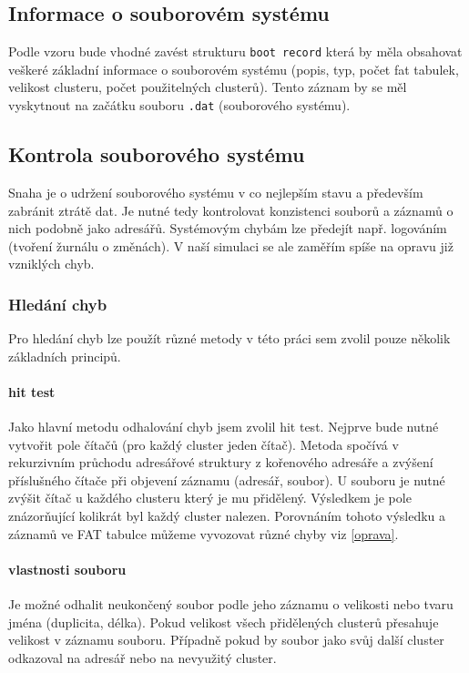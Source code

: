 \documentclass[12pt]{article}
\begin{document}
\subsection{Informace o souborovém systému}
Podle vzoru bude vhodné zavést strukturu \texttt{boot record} která by měla obsahovat veškeré základní informace o souborovém systému (popis, typ, počet fat tabulek, velikost clusteru, počet použitelných clusterů). Tento záznam by se měl vyskytnout na začátku souboru \texttt{.dat} (souborového systému).

\subsection{Kontrola souborového systému}
Snaha je o udržení souborového systému v co nejlepším stavu a především zabránit ztrátě dat. Je nutné tedy kontrolovat konzistenci souborů a záznamů o nich podobně jako adresářů. Systémovým chybám lze předejít např. logováním (tvoření žurnálu o změnách). V naší simulaci se ale zaměřím spíše na opravu již vzniklých chyb.

\subsubsection{Hledání chyb}
Pro hledání chyb lze použít různé metody v této práci sem zvolil pouze několik základních principů.

\paragraph{hit test}
Jako hlavní metodu odhalování chyb jsem zvolil hit test. Nejprve bude nutné vytvořit pole čítačů (pro každý cluster jeden čítač). Metoda spočívá v rekurzivním průchodu adresářové struktury z kořenového adresáře a zvýšení příslušného čítače při objevení záznamu (adresář, soubor). U souboru je nutné zvýšit čítač u každého clusteru který je mu přidělený. Výsledkem je pole znázorňující kolikrát byl každý cluster nalezen. Porovnáním tohoto výsledku a záznamů ve FAT tabulce můžeme vyvozovat různé chyby viz \ref{oprava}.

\paragraph{vlastnosti souboru}
Je možné odhalit neukončený soubor podle jeho záznamu o velikosti nebo tvaru jména (duplicita, délka). Pokud velikost všech přidělených clusterů přesahuje velikost v záznamu souboru. Případně pokud by soubor jako svůj další cluster odkazoval na adresář nebo na nevyužitý cluster.
\end{document}
